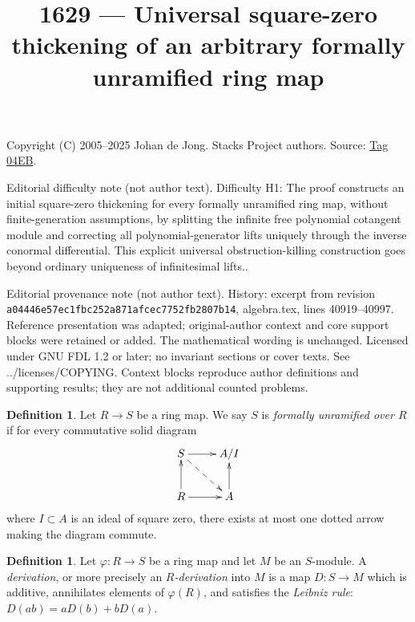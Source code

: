\documentclass{amsart}
\theoremstyle{plain}
\theoremstyle{definition}
\newtheorem{definition}[subsection]{Definition}
\theoremstyle{remark}
\numberwithin{equation}{subsection}
\begin{document}
\title[Stacks Project, Tag 04EB]{1629 --- Universal square-zero thickening of an arbitrary formally unramified ring map}
\maketitle
\noindent Copyright (C) 2005--2025 Johan de Jong. Stacks Project authors. Source: \href{https://stacks.math.columbia.edu/tag/04EB}{Tag 04EB}.

\noindent Editorial difficulty note (not author text). Difficulty H1: The proof constructs an initial square-zero thickening for every formally unramified ring map, without finite-generation assumptions, by splitting the infinite free polynomial cotangent module and correcting all polynomial-generator lifts uniquely through the inverse conormal differential. This explicit universal obstruction-killing construction goes beyond ordinary uniqueness of infinitesimal lifts..

\noindent Editorial provenance note (not author text). History: excerpt from revision \texttt{a0444\allowbreak 6e57e\allowbreak c1fbc\allowbreak 252a8\allowbreak 71afc\allowbreak ec775\allowbreak 2fb28\allowbreak 07b14}, algebra.tex, lines 40919--40997. Reference presentation was adapted; original-author context and core support blocks were retained or added. The mathematical wording is unchanged. Licensed under GNU FDL 1.2 or later; no invariant sections or cover texts. See ../licenses/COPYING. Context blocks reproduce author definitions and supporting results; they are not additional counted problems.

\begin{definition}
\label{definition-formally-unramified}
Let $R \to S$ be a ring map.
We say $S$ is {\it formally unramified over $R$} if for every
commutative solid diagram
$$
\xymatrix{
S \ar[r] \ar@{-->}[rd] & A/I \\
R \ar[r] \ar[u] & A \ar[u]
}
$$
where $I \subset A$ is an ideal of square zero, there exists
at most one dotted arrow making the diagram commute.
\end{definition}

\begin{definition}
\label{definition-derivation}
Let $\varphi : R \to S$ be a ring map and let $M$ be an $S$-module.
A {\it derivation}, or more precisely an
{\it $R$-derivation} into $M$ is a map $D : S \to M$
which is additive, annihilates elements of $\varphi(R)$,
and satisfies the {\it Leibniz rule}: $D(ab) = aD(b) + bD(a)$.
\end{definition}
\end{document}
